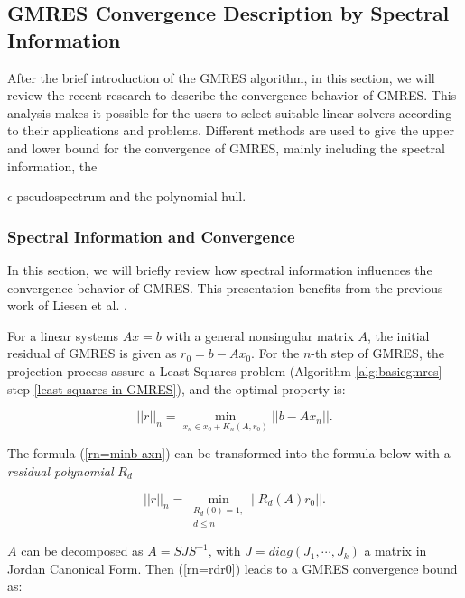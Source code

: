 \subsection{GMRES Convergence Description by Spectral Information}\label{GMRES Convergence Description by Spectral Information}

After the brief introduction of the GMRES algorithm, in this section, we will review the recent research to describe the convergence behavior of GMRES. This analysis makes it possible for the users to select suitable linear solvers according to their applications and problems. Different methods are used to give the upper and lower bound for the convergence of GMRES, mainly including the spectral information, the {$\epsilon$-pseudospectrum and the polynomial hull.
	
	
	\subsubsection{Spectral Information and Convergence}
	
	In this section, we will briefly review how spectral information influences the convergence behavior of GMRES. This presentation benefits from the previous work of Liesen et al. \cite{liesen2004convergence, liesen2013krylov}.
	
	For a linear systems $Ax=b$ with a general nonsingular matrix $A$, the initial residual of GMRES is given as $r_0=b-Ax_0$. For the $n$-th step of GMRES, the projection process assure a Least Squares problem (Algorithm \ref{alg:basicgmres} step \ref{least squares in GMRES}), and the optimal property is:
	
	\begin{equation}
	\label{rn=minb-axn}
	||r||_n=\min_{x_n \in x_0+K_n(A,r_0)}||b-Ax_n||.
	\end{equation}
	
	The formula (\ref{rn=minb-axn}) can be transformed into the formula below with a \textit{residual polynomial} $R_d$
	
	\begin{equation}
	\label{rn=rdr0}
	||r||_n=\min_{\substack{R_d(0)=1, \\ d \leq n}}||R_d(A)r_0||.
	\end{equation}
	
	$A$ can be decomposed as $A=SJS^{-1}$, with $J=diag(J_1,\cdots, J_k)$ a matrix in Jordan Canonical Form. Then (\ref{rn=rdr0}) leads to a GMRES convergence bound as:
	
}
